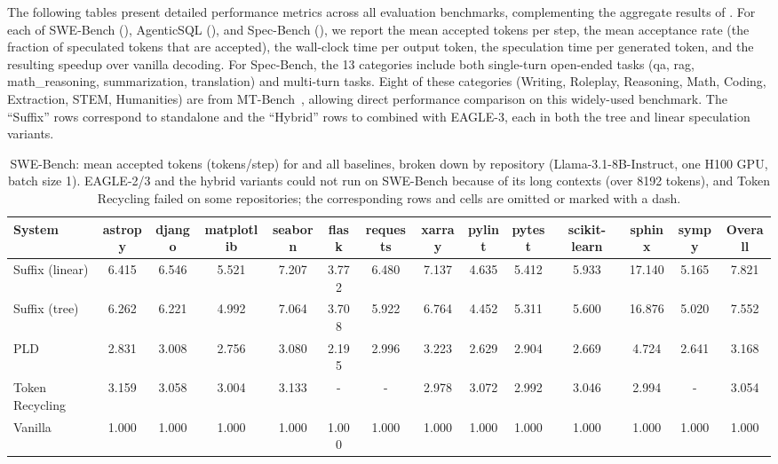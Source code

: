 The following tables present detailed performance metrics across all evaluation benchmarks, complementing the aggregate results of . For each of SWE-Bench (), AgenticSQL (), and Spec-Bench (), we report the mean accepted tokens per step, the mean acceptance rate (the fraction of speculated tokens that are accepted), the wall-clock time per output token, the speculation time per generated token, and the resulting speedup over vanilla decoding. For Spec-Bench, the 13 categories include both single-turn open-ended tasks (qa, rag, math\_reasoning, summarization, translation) and multi-turn tasks. Eight of these categories (Writing, Roleplay, Reasoning, Math, Coding, Extraction, STEM, Humanities) are from MT-Bench~\citep{mtbench}, allowing direct performance comparison on this widely-used benchmark. The ``Suffix'' rows correspond to standalone \SuffixDecoding and the ``Hybrid'' rows to \SuffixDecoding combined with EAGLE-3, each in both the tree and linear speculation variants.

\begin{table}[htbp]
\centering
\caption{SWE-Bench: mean accepted tokens (tokens/step) for \SuffixDecoding and all baselines, broken down by repository (Llama-3.1-8B-Instruct, one H100 GPU, batch size 1). EAGLE-2/3 and the hybrid variants could not run on SWE-Bench because of its long contexts (over 8192 tokens), and Token Recycling failed on some repositories; the corresponding rows and cells are omitted or marked with a dash.}
\label{suffixdecoding:tab:swe-mat}
\small
\begin{adjustbox}{width=\linewidth}
\begin{tabular}{lccccccccccccc}
\toprule
\textbf{System} & astropy & django & matplotlib & seaborn & flask & requests & xarray & pylint & pytest & scikit-learn & sphinx & sympy & \textbf{Overall} \\
\midrule
Suffix (linear) & 6.415 & 6.546 & 5.521 & 7.207 & 3.772 & 6.480 & 7.137 & 4.635 & 5.412 & 5.933 & 17.140 & 5.165 & 7.821 \\
Suffix (tree) & 6.262 & 6.221 & 4.992 & 7.064 & 3.708 & 5.922 & 6.764 & 4.452 & 5.311 & 5.600 & 16.876 & 5.020 & 7.552 \\
PLD & 2.831 & 3.008 & 2.756 & 3.080 & 2.195 & 2.996 & 3.223 & 2.629 & 2.904 & 2.669 & 4.724 & 2.641 & 3.168 \\
Token Recycling & 3.159 & 3.058 & 3.004 & 3.133 & - & - & 2.978 & 3.072 & 2.992 & 3.046 & 2.994 & - & 3.054 \\
Vanilla & 1.000 & 1.000 & 1.000 & 1.000 & 1.000 & 1.000 & 1.000 & 1.000 & 1.000 & 1.000 & 1.000 & 1.000 & 1.000 \\
\bottomrule
\end{tabular}
\end{adjustbox}
\end{table}

